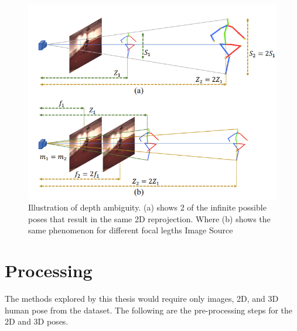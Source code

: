 \begin{figure}[!h]
    \centering
    \includegraphics[scale=0.4]{figures/depthambi.png}
    \caption{Illustration of depth ambiguity. (a) shows 2 of the infinite possible poses that result in the same 2D reprojection. Where (b) shows the same phenomenon for different focal legths
    Image Source \cite{poselifter}}
    \label{fig:depthambi}
\end{figure}










\section{Processing}

The methods explored by this thesis would require only images, 2D, and 3D human pose from the dataset. The following are the pre-processing steps for the 2D and 3D poses.


